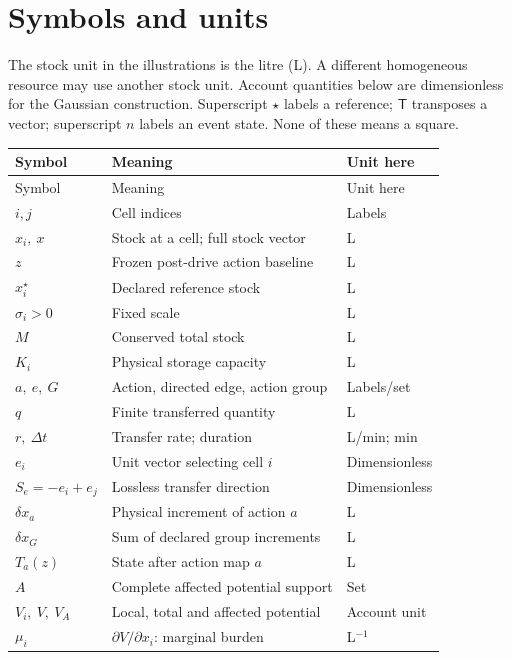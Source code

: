 \chapter*{Symbols and units}
The stock unit in the illustrations is the litre (L). A different homogeneous resource may use another stock unit. Account quantities below are dimensionless for the Gaussian construction. Superscript $\star$ labels a reference; $\mathsf T$ transposes a vector; superscript $n$ labels an event state. None of these means a square.

\renewcommand{\arraystretch}{1.16}
\begin{longtable}{@{}p{65pt}p{194pt}p{80pt}@{}}
\toprule Symbol & Meaning & Unit here\\\midrule\endfirsthead
\toprule Symbol & Meaning & Unit here\\\midrule\endhead
\bottomrule\endfoot
$i,j$ & Cell indices & Labels\\
$x_i,\ x$ & Stock at a cell; full stock vector & L\\
$z$ & Frozen post-drive action baseline & L\\
$x_i^\star$ & Declared reference stock & L\\
$\sigma_i>0$ & Fixed scale & L\\
$M$ & Conserved total stock & L\\
$K_i$ & Physical storage capacity & L\\
$a,\ e,\ G$ & Action, directed edge, action group & Labels/set\\
$q$ & Finite transferred quantity & L\\
$r,\ \Delta t$ & Transfer rate; duration & L/min; min\\
$e_i$ & Unit vector selecting cell $i$ & Dimensionless\\
$S_e=-e_i+e_j$ & Lossless transfer direction & Dimensionless\\
$\delta x_a$ & Physical increment of action $a$ & L\\
$\delta x_G$ & Sum of declared group increments & L\\
$T_a(z)$ & State after action map $a$ & L\\
$A$ & Complete affected potential support & Set\\
$V_i,\ V,\ V_A$ & Local, total and affected potential & Account unit\\
$\mu_i$ & $\partial V/\partial x_i$: marginal burden & L$^{-1}$\\

\end{longtable}
